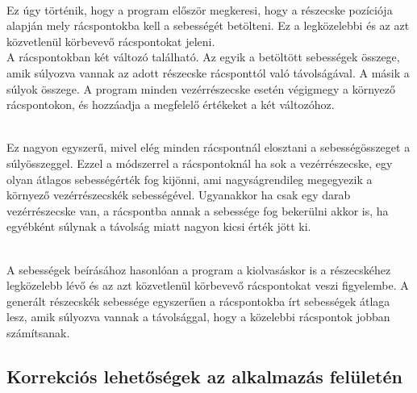 
\begin{description}
\setlength{\parindent}{2ex}
\item [A vezérrészecskék sebességének betöltése a rácspontokba:] \hfill \\
Ez úgy történik, 
hogy a program először megkeresi, 
hogy a részecske pozíciója alapján mely rácspontokba 
kell a sebességét betölteni. 
Ez a legközelebbi és az azt közvetlenül körbevevő rácspontokat jeleni. \\
A rácspontokban két változó található. 
Az egyik a betöltött sebességek összege, 
amik súlyozva vannak az adott részecske rácsponttól való távolságával. 
A másik a súlyok összege. 
A program minden vezérrészecske esetén végigmegy a környező rácspontokon, 
és hozzáadja a megfelelő értékeket a két változóhoz. 
\item [A rácspontra jellemző átlagos sebességérték kiszámítása:] \hfill \\ 
Ez nagyon egyszerű, 
mivel elég minden rácspontnál elosztani a sebességösszeget a súlyösszeggel. 
Ezzel a módszerrel a rácspontoknál ha sok a vezérrészecske, 
egy olyan átlagos sebességérték fog kijönni, 
ami nagyságrendileg megegyezik a környező vezérrészecskék sebességével. 
Ugyanakkor ha csak egy darab vezérrészecske van, 
a rácspontba annak a sebessége fog bekerülni akkor is, 
ha egyébként súlynak a távolság miatt nagyon kicsi érték jött ki.
\item [A generált részecskék sebességének kiszámítása:] \hfill \\ 
A sebességek beírásához hasonlóan a program 
a kiolvasáskor is a részecskéhez legközelebb lévő 
és az azt közvetlenül körbevevő rácspontokat veszi figyelembe. 
A generált részecskék sebessége egyszerűen 
a rácspontokba írt sebességek átlaga lesz, 
amik súlyozva vannak a távolsággal, 
hogy a közelebbi rácspontok jobban számítsanak. 
\end{description}

\subsection{Korrekciós lehetőségek az alkalmazás felületén}

